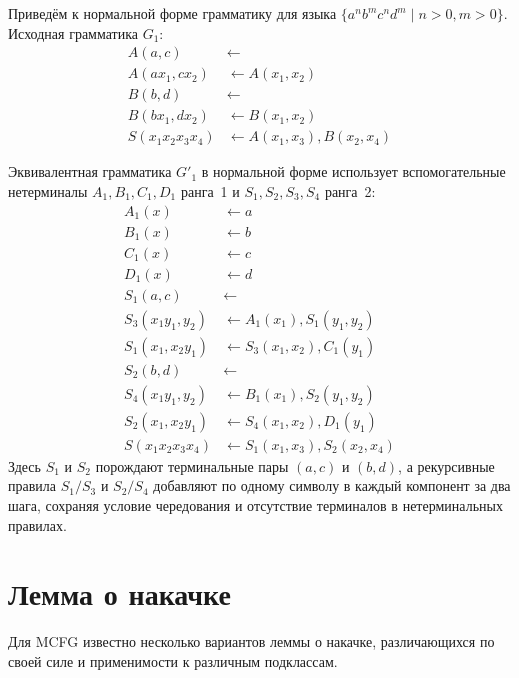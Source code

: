 \begin{example}
    Приведём к нормальной форме грамматику для языка $\{a^n b^m c^n d^m \mid n > 0, m > 0\}$.
    Исходная грамматика $G_1$:\begin{align*}
        A(a, c)         &\leftarrow \\
        A(a x_1, c x_2) &\leftarrow A(x_1, x_2) \\
        B(b, d)         &\leftarrow \\
        B(b x_1, d x_2) &\leftarrow B(x_1, x_2) \\
        S(x_1 x_2 x_3 x_4) &\leftarrow A(x_1, x_3), B(x_2, x_4)
    \end{align*}

    Эквивалентная грамматика $G'_1$ в нормальной форме использует вспомогательные нетерминалы $A_1,B_1,C_1,D_1$ ранга~1 и
    $S_1,S_2,S_3,S_4$ ранга~2:\begin{align*}
        A_1(x)              &\leftarrow a \\
        B_1(x)              &\leftarrow b \\
        C_1(x)              &\leftarrow c \\
        D_1(x)              &\leftarrow d \\[4pt]
        S_1(a, c)           &\leftarrow \\
        S_3(x_1 y_1, y_2)   &\leftarrow A_1(x_1), S_1(y_1, y_2) \\
        S_1(x_1, x_2 y_1)   &\leftarrow S_3(x_1, x_2), C_1(y_1) \\[4pt]
        S_2(b, d)           &\leftarrow \\
        S_4(x_1 y_1, y_2)   &\leftarrow B_1(x_1), S_2(y_1, y_2) \\
        S_2(x_1, x_2 y_1)   &\leftarrow S_4(x_1, x_2), D_1(y_1) \\[4pt]
        S(x_1 x_2 x_3 x_4) &\leftarrow S_1(x_1, x_3), S_2(x_2, x_4)
    \end{align*}
    Здесь $S_1$ и $S_2$ порождают терминальные пары $(a,c)$ и $(b,d)$, а рекурсивные правила $S_1/S_3$ и $S_2/S_4$ добавляют по одному символу в каждый компонент за два шага, сохраняя условие чередования и отсутствие терминалов в нетерминальных правилах.
\end{example}

\section{Лемма о накачке}

Для MCFG известно несколько вариантов леммы о накачке, различающихся по своей силе и применимости к различным подклассам.

